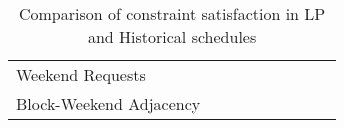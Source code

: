 \begin{table}[h]
\begin{tabular}{l|cc|cc|cc|cc}
    	Weekend Requests                                             &            &                       &            &                       &            &                       &            &                      \\
    	Block-Weekend Adjacency                                      &            &                       &            &                       &            &                       &            &
    \end{tabular}%
	\caption{Comparison of constraint satisfaction in LP and Historical schedules}
	\label{tbl:constraints-comparison}%
\end{table}%
